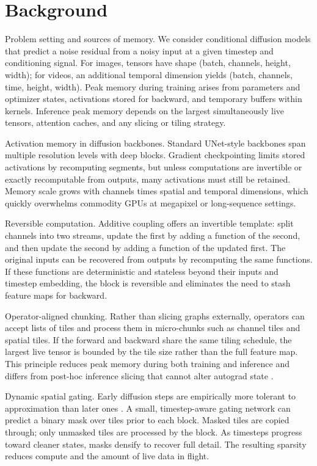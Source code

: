 \documentclass{article}
\begin{document}
\section{Background}
Problem setting and sources of memory. We consider conditional diffusion models that predict a noise residual from a noisy input at a given timestep and conditioning signal. For images, tensors have shape (batch, channels, height, width); for videos, an additional temporal dimension yields (batch, channels, time, height, width). Peak memory during training arises from parameters and optimizer states, activations stored for backward, and temporary buffers within kernels. Inference peak memory depends on the largest simultaneously live tensors, attention caches, and any slicing or tiling strategy.

Activation memory in diffusion backbones. Standard UNet-style backbones span multiple resolution levels with deep blocks. Gradient checkpointing limits stored activations by recomputing segments, but unless computations are invertible or exactly recomputable from outputs, many activations must still be retained. Memory scale grows with channels times spatial and temporal dimensions, which quickly overwhelms commodity GPUs at megapixel or long-sequence settings.

Reversible computation. Additive coupling offers an invertible template: split channels into two streams, update the first by adding a function of the second, and then update the second by adding a function of the updated first. The original inputs can be recovered from outputs by recomputing the same functions. If these functions are deterministic and stateless beyond their inputs and timestep embedding, the block is reversible and eliminates the need to stash feature maps for backward.

Operator-aligned chunking. Rather than slicing graphs externally, operators can accept lists of tiles and process them in micro-chunks such as channel tiles and spatial tiles. If the forward and backward share the same tiling schedule, the largest live tensor is bounded by the tile size rather than the full feature map. This principle reduces peak memory during both training and inference and differs from post-hoc inference slicing that cannot alter autograd state \cite{zhan-2024-fast}.

Dynamic spatial gating. Early diffusion steps are empirically more tolerant to approximation than later ones \cite{author-year-leveraging}. A small, timestep-aware gating network can predict a binary mask over tiles prior to each block. Masked tiles are copied through; only unmasked tiles are processed by the block. As timesteps progress toward cleaner states, masks densify to recover full detail. The resulting sparsity reduces compute and the amount of live data in flight.
\end{document}
